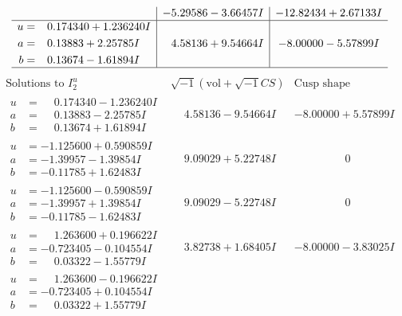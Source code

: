 \documentclass[1p]{elsarticle_modified}
\theoremstyle{definition}
\newcommand{\I}{\sqrt{-1}}
\begin{document}
$$\begin{array}{c|c|c}
 & -5.29586 - 3.66457 I & -12.82434 + 2.67133 I \\ \hline\begin{aligned}
u &= \phantom{-}0.174340 + 1.236240 I \\
a &= \phantom{-}0.13883 + 2.25785 I \\
b &= \phantom{-}0.13674 - 1.61894 I\end{aligned}
 & \phantom{-}4.58136 + 9.54664 I & -8.00000 - 5.57899 I\\
 \hline 
 \end{array}$$\newpage$$\begin{array}{c|c|c}  
\text{Solutions to }I^u_{2}& \I (\text{vol} + \sqrt{-1}CS) & \text{Cusp shape}\\
 \hline 
\begin{aligned}
u &= \phantom{-}0.174340 - 1.236240 I \\
a &= \phantom{-}0.13883 - 2.25785 I \\
b &= \phantom{-}0.13674 + 1.61894 I\end{aligned}
 & \phantom{-}4.58136 - 9.54664 I & -8.00000 + 5.57899 I \\ \hline\begin{aligned}
u &= -1.125600 + 0.590859 I \\
a &= -1.39957 - 1.39854 I \\
b &= -0.11785 + 1.62483 I\end{aligned}
 & \phantom{-}9.09029 + 5.22748 I & \phantom{-0.000000 } 0 \\ \hline\begin{aligned}
u &= -1.125600 - 0.590859 I \\
a &= -1.39957 + 1.39854 I \\
b &= -0.11785 - 1.62483 I\end{aligned}
 & \phantom{-}9.09029 - 5.22748 I & \phantom{-0.000000 } 0 \\ \hline\begin{aligned}
u &= \phantom{-}1.263600 + 0.196622 I \\
a &= -0.723405 - 0.104554 I \\
b &= \phantom{-}0.03322 - 1.55779 I\end{aligned}
 & \phantom{-}3.82738 + 1.68405 I & -8.00000 - 3.83025 I \\ \hline\begin{aligned}
u &= \phantom{-}1.263600 - 0.196622 I \\
a &= -0.723405 + 0.104554 I \\
b &= \phantom{-}0.03322 + 1.55779 I\end{aligned}

\end{array}$$
\end{document}
